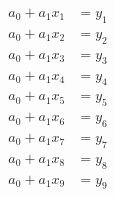 \begin{equation}
  \begin{split}
    a_{0} + a_{1} x_{1} &= y_{1} \\
    a_{0} + a_{1} x_{2} &= y_{2} \\
    a_{0} + a_{1} x_{3} &= y_{3} \\
    a_{0} + a_{1} x_{4} &= y_{4} \\
    a_{0} + a_{1} x_{5} &= y_{5} \\
    a_{0} + a_{1} x_{6} &= y_{6} \\
    a_{0} + a_{1} x_{7} &= y_{7} \\
    a_{0} + a_{1} x_{8} &= y_{8} \\
    a_{0} + a_{1} x_{9} &= y_{9} 
  \end{split}
  \label{eqn:bevington linear system}
\end{equation}
\endinput  %